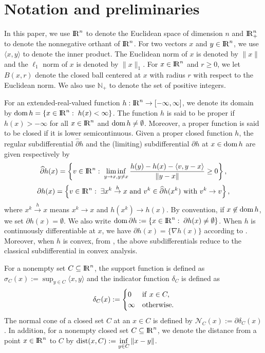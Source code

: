 \documentclass[10pt]{article}
\numberwithin{equation}{section}
\def\R{{\rm I\!R}}
\def\d{{\rm dist}}
\def\dom{{\rm dom}\,}
\begin{document}
\section{Notation and preliminaries}\label{sec2}
In this paper, we use $\R^n$ to denote the Euclidean space of dimension $n$ and $\R^n_+$ to denote the nonnegative orthant of $\R^n$. For two vectors $x$ and $y\in\R^n$, we use $\langle x, y\rangle$ to denote the inner product. The Euclidean norm of $x$ is denoted by $\|x\|$ and the $\ell_1$ norm of $x$ is denoted by $\|x\|_1$. For $x\in\R^n$ and $r\ge 0$, we let $B(x,r)$ denote the closed ball centered at $x$ with radius $r$ {\color{blue} with respect to the Euclidean norm}. We also use $\mathbb{N}_+$ to denote the set of positive integers.

For an extended-real-valued function $h: \R^n \to [-\infty, \infty]$, we denote its domain by $\dom h = \{x\in\R^n:\; h(x) <\infty\}$. The function $h$ is said to be proper if $h(x)>-\infty$ for all $x \in \R^n$ and $\dom h\not = \emptyset$. Moreover, a proper function is said to be closed if it is lower semicontinuous. Given a proper closed function $h$, the regular subdifferential $\widehat{\partial} h$ and the (limiting) subdifferential $\partial h$ at $x\in\dom h$ are given respectively by
\[
\widehat{\partial} h(x) = \left\{v\in\R^n:\; \liminf_{y\to x, y\not= x}\frac{h(y) - h(x) - \langle v, y - x\rangle}{\|y - x\|}\geq 0 \right\},
\]
\[
\partial h(x) = \left\{v\in\R^n:\; \exists x^k\overset{h}\rightarrow x\text{ and } v^k\in\widehat{\partial} h(x^k) \text{ with } v^k\rightarrow v \right\},
\]
where $x^k\overset{h}\rightarrow x$ means $x^k\rightarrow x$ and $h(x^k)\rightarrow h(x)$. By convention, if $x\not\in\dom h$, we set $\partial h(x) = \emptyset$. We also write $\dom\partial h:= \{x\in\R^n:\; \partial h(x) \not= \emptyset\}$. When $h$ is continuously differentiable at $x$, we have $\partial h(x) = \{\nabla h(x)\}$ according to \cite[Exercise~8.8(b)]{RoWe98}. Moreover, when $h$ is convex, from \cite[Proposition~8.12]{RoWe98}, the above subdifferentials reduce to the classical subdifferential in convex analysis.

For a nonempty set $C\subseteq\R^n$, the support function is defined as $\sigma_C(x) := \sup_{y\in C}\langle x,y\rangle$ and the indicator function $\delta_C$ is defined as
\[
\delta_C(x): =\begin{cases}
  0 & {\rm if}\ x\in C,\\
  \infty & {\rm otherwise}.
\end{cases}
\]
The normal cone of a closed set $C$ at an $x\in C$ is defined by $\mathcal{N}_C(x):= \partial\delta_C(x)$. In addition, for a nonempty closed set $C\subseteq\R^n$, we denote the distance from a point $x\in\R^n$ to $C$ by $\d(x,C):=\inf\limits_{y\in C}\|x - y\|$.
\end{document}
